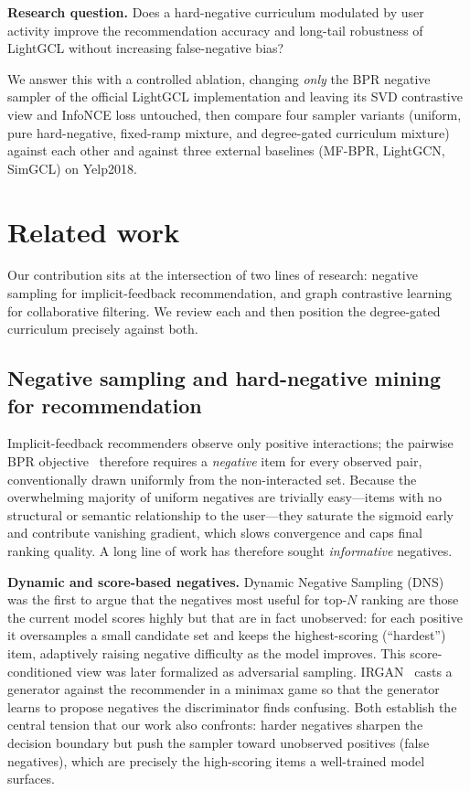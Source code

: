 \documentclass{article}
\begin{document}
\textbf{Research question.} Does a hard-negative curriculum modulated by user activity
improve the recommendation accuracy and long-tail robustness of LightGCL without
increasing false-negative bias?

We answer this with a controlled ablation, changing \emph{only} the BPR negative sampler
of the official LightGCL implementation and leaving its SVD contrastive view and
InfoNCE loss untouched, then compare four sampler variants (uniform, pure hard-negative,
fixed-ramp mixture, and degree-gated curriculum mixture) against each other and against
three external baselines (MF-BPR, LightGCN, SimGCL) on Yelp2018.

\section{Related work}
\label{sec:related}

Our contribution sits at the intersection of two lines of research: negative
sampling for implicit-feedback recommendation, and graph contrastive learning
for collaborative filtering. We review each and then position the degree-gated
curriculum precisely against both.

\subsection{Negative sampling and hard-negative mining for recommendation}
Implicit-feedback recommenders observe only positive interactions; the pairwise
BPR objective~\cite{bpr} therefore requires a \emph{negative} item for every
observed pair, conventionally drawn uniformly from the non-interacted set. Because
the overwhelming majority of uniform negatives are trivially easy---items with no
structural or semantic relationship to the user---they saturate the sigmoid early
and contribute vanishing gradient, which slows convergence and caps final ranking
quality. A long line of work has therefore sought \emph{informative} negatives.

\textbf{Dynamic and score-based negatives.} Dynamic Negative Sampling
(DNS)~\cite{dns} was the first to argue that the negatives most useful for
top-$N$ ranking are those the current model scores highly but that are in fact
unobserved: for each positive it oversamples a small candidate set and keeps the
highest-scoring (``hardest'') item, adaptively raising negative difficulty as the
model improves. This score-conditioned view was later formalized as
adversarial sampling. IRGAN~\cite{irgan} casts a generator against the
recommender in a minimax game so that the generator learns to propose negatives
the discriminator finds confusing. Both establish the central tension that our
work also confronts: harder negatives sharpen the decision boundary but push the
sampler toward unobserved positives (false negatives), which are precisely the
high-scoring items a well-trained model surfaces.
\end{document}
